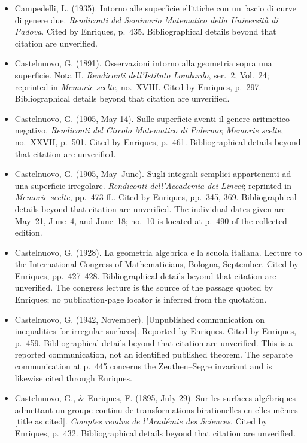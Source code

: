 \begin{sloppypar}
\begin{itemize}
\item Campedelli, L. (1935). Intorno alle superficie ellittiche con un fascio di curve di genere due. \emph{Rendiconti del Seminario Matematico della Università di Padova}. Cited by Enriques, p.~435. Bibliographical details beyond that citation are unverified.

\item Castelnuovo, G. (1891). Osservazioni intorno alla geometria sopra una superficie. Nota II. \emph{Rendiconti dell'Istituto Lombardo}, ser.~2, Vol.~24; reprinted in \emph{Memorie scelte}, no.~XVIII. Cited by Enriques, p.~297. Bibliographical details beyond that citation are unverified.

\item Castelnuovo, G. (1905, May 14). Sulle superficie aventi il genere aritmetico negativo. \emph{Rendiconti del Circolo Matematico di Palermo}; \emph{Memorie scelte}, no.~XXVII, p.~501. Cited by Enriques, p.~461. Bibliographical details beyond that citation are unverified.

\item Castelnuovo, G. (1905, May--June). Sugli integrali semplici appartenenti ad una superficie irregolare. \emph{Rendiconti dell'Accademia dei Lincei}; reprinted in \emph{Memorie scelte}, pp.~473 ff.. Cited by Enriques, pp.~345, 369. Bibliographical details beyond that citation are unverified. The individual dates given are May~21, June~4, and June~18; no.~10 is located at p.~490 of the collected edition.

\item Castelnuovo, G. (1928). La geometria algebrica e la scuola italiana. Lecture to the International Congress of Mathematicians, Bologna, September. Cited by Enriques, pp.~427--428. Bibliographical details beyond that citation are unverified. The congress lecture is the source of the passage quoted by Enriques; no publication-page locator is inferred from the quotation.

\item Castelnuovo, G. (1942, November). [Unpublished communication on inequalities for irregular surfaces]. Reported by Enriques. Cited by Enriques, p.~459. Bibliographical details beyond that citation are unverified. This is a reported communication, not an identified published theorem. The separate communication at p.~445 concerns the Zeuthen--Segre invariant and is likewise cited through Enriques.

\item Castelnuovo, G., \& Enriques, F. (1895, July 29). Sur les surfaces algébriques admettant un groupe continu de transformations birationelles en elles-mêmes [title as cited]. \emph{Comptes rendus de l'Académie des Sciences}. Cited by Enriques, p.~432. Bibliographical details beyond that citation are unverified.


\end{itemize}
\end{sloppypar}

